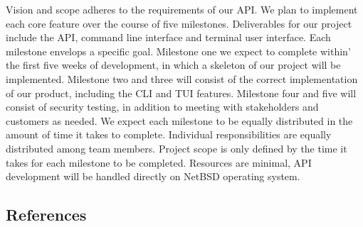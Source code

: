 Vision and scope adheres to the requirements of our API. We plan to implement each core feature over the course of five milestones. 
Deliverables for our project include the API, command line interface and terminal user interface. Each milestone envelops a 
specific goal. Milestone one we expect to complete within’ the first five weeks of development, in which a skeleton of our project 
will be implemented. Milestone two and three will consist of the correct implementation of our product, including the CLI and TUI features. 
Milestone four and five will consist of security testing, in addition to meeting with stakeholders and customers as needed. We expect each 
milestone to be equally distributed in the amount of time it takes to complete. Individual responsibilities are equally distributed among 
team members. Project scope is only defined by the time it takes for each milestone to be completed. Resources are minimal, API development 
will be handled directly on NetBSD operating system. 

\subsection{References}


